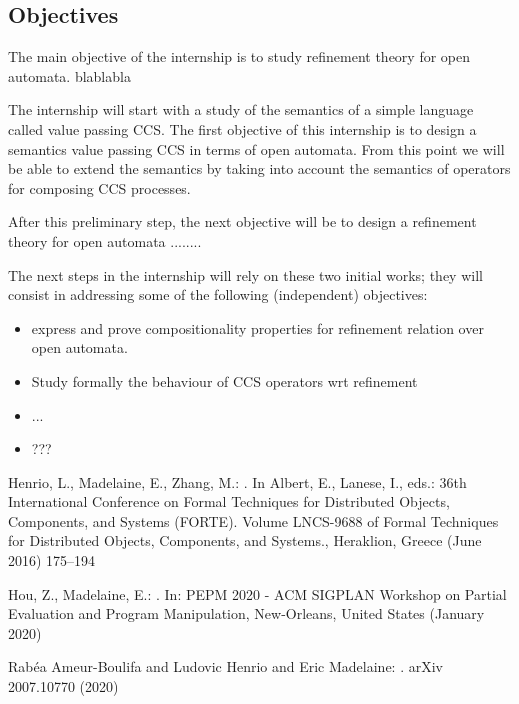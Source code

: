 \documentclass[11pt,fleqn]{article}
\begin{document}
\subsection*{Objectives}


The main objective of the internship is to study refinement theory for open automata. blablabla

The internship will start with a study of the semantics of a simple language called value passing CCS. The first objective of this internship is to design a semantics value passing CCS in terms of open automata. From this point we will be able to extend the semantics by taking into account the semantics of operators for composing CCS processes.

After this preliminary step, the next objective will be to design a refinement theory for open automata ........



The next steps in the internship will rely on these two initial works; they will consist in addressing some of the following (independent) objectives:
\begin{itemize}
\item express and prove compositionality properties for refinement relation over open automata.
\item Study formally the behaviour of CCS operators wrt refinement
\item  ...
\item ???
\end{itemize}

\begin{thebibliography}{9}
Henrio, L., Madelaine, E., Zhang, M.:
.
\newblock In Albert, E., Lanese, I., eds.: {36th International Conference on
  Formal Techniques for Distributed Objects, Components, and Systems (FORTE)}.
  Volume LNCS-9688 of Formal Techniques for Distributed Objects, Components,
  and Systems., Heraklion, Greece (June 2016)  175--194

Hou, Z., Madelaine, E.:
.
\newblock In: {PEPM 2020 - ACM SIGPLAN Workshop on Partial Evaluation and
  Program Manipulation}, New-Orleans, United States (January 2020)

Rabéa Ameur-Boulifa and Ludovic Henrio and Eric Madelaine:
.
\newblock arXiv {2007.10770} (2020)
\end{thebibliography}
\end{document}

